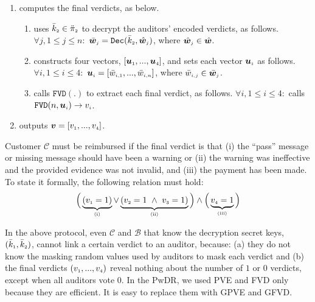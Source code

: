 \begin{enumerate}[leftmargin=.46cm]
\begin{enumerate}
\item computes the final verdicts, as below. 
%
\begin{enumerate}
%
\item uses $\bar k_{\scriptscriptstyle 2}\in \ddot \pi_{\scriptscriptstyle 2}$ to decrypt the auditors' encoded verdicts, as follows. $ \forall j, 1\leq j \leq n:$
%
$ \bar {\bm w}_{\scriptscriptstyle j}= \mathtt{Dec}(\bar k_{\scriptscriptstyle 2}, \hat{\bm w}_{\scriptscriptstyle j})$, where $\hat{\bm w}_{\scriptscriptstyle j}\in \hat{\bm w}$.
 \item constructs four vectors, $[\bm u_{\scriptscriptstyle 1},...,\bm u_{\scriptscriptstyle 4}]$, and sets  each vector $\bm u_{\scriptscriptstyle i}$ as follows. $\forall i, 1\leq i \leq 4:$
  $\bm u_{\scriptscriptstyle i}=[\bar{w}_{\scriptscriptstyle i,1},...,\bar{w}_{\scriptscriptstyle i,n}]$, where $\bar{w}_{\scriptscriptstyle i,j}\in \bar {\bm w}_{\scriptscriptstyle j}$. 
%
\item calls $\mathtt{FVD}(.)$ to extract each final verdict, as follows. $\forall i, 1\leq i \leq 4:$ calls $\mathtt{FVD}(n,  {\bm u}_{\scriptscriptstyle i})\rightarrow  v_{\scriptscriptstyle i}$. 




%
%
%
%
\end{enumerate}
%
\item outputs $\bm v=[v_{\scriptscriptstyle 1},...,v_{\scriptscriptstyle 4}]$.
\end{enumerate}
\end{enumerate}

Customer $\mathcal{C}$ must be reimbursed if the final verdict is that (i)  the ``pass'' message or missing message should have been a warning or (ii)  the warning was ineffective and the provided evidence was not invalid, and (iii) the payment has been made. To state it formally, the following relation must hold: 
%
$$\Big( \underbrace{(v_{\scriptscriptstyle 1}=1)}_{\scriptscriptstyle (\text{i})}\vee  \underbrace{(v_{\scriptscriptstyle 2}=1\ \wedge\ v_{\scriptscriptstyle 3}=1)}_{\scriptscriptstyle (\text {ii})}\Big)\wedge\Big(\underbrace{v_{\scriptscriptstyle 4}=1}_{\scriptscriptstyle (\text{iii})}\Big)$$

\vspace{-2mm}
In the above protocol, even $\mathcal{C}$ and $\mathcal{B}$ that know the decryption secret keys, $(\bar k_{\scriptscriptstyle 1}, \bar k_{\scriptscriptstyle 2})$, cannot link a certain verdict to an auditor, because:  (a) they do not know the masking random values used by auditors to mask each verdict and (b) the final verdicts $(v_{\scriptscriptstyle 1},..., v_{\scriptscriptstyle 4})$ reveal nothing about the number of $1$ or $0$ verdicts, except when all auditors vote $0$.   In the PwDR, we used PVE and FVD only because they are efficient. It is easy to replace them with GPVE and GFVD. 

